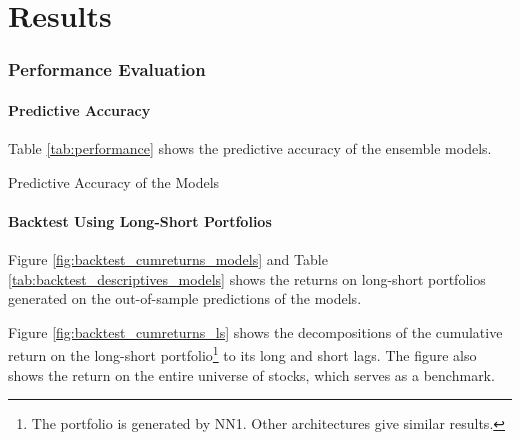 \chapter{Results}
\label{chap:res}

\subsection{Performance Evaluation}

	\subsubsection{Predictive Accuracy}
	
		Table \ref{tab:performance} shows the predictive accuracy of the ensemble models. 		
			\begin{table}
				\centering
				
				\caption{Predictive Accuracy of the Models}
				\label{tab:performance}
			\end{table}

	\subsubsection{Backtest Using Long-Short Portfolios}
	
		Figure \ref{fig:backtest_cumreturns_models} and Table \ref{tab:backtest_descriptives_models} shows the returns on long-short portfolios generated on the out-of-sample predictions of the models.
		
	
		Figure \ref{fig:backtest_cumreturns_ls} shows the decompositions of the cumulative return on the long-short portfolio\footnote{The portfolio is generated by NN1. Other architectures give similar results.} to its long and short lags. The figure also shows the return on the entire universe of stocks, which serves as a benchmark.  
			
